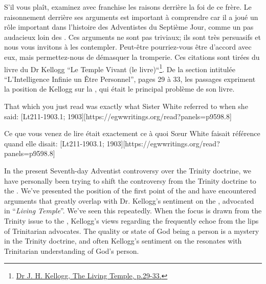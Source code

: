 S'il vous plaît, examinez avec franchise les raisons derrière la foi de ce frère. Le raisonnement derrière ses arguments est important à comprendre car il a joué un rôle important dans l'histoire des Adventistes du Septième Jour, comme un pas audacieux loin des . Ces arguments ne sont pas triviaux; ils sont très persuasifs et nous vous invitons à les contempler. Peut-être pourriez-vous être d'accord avec eux, mais permettez-nous de démasquer la tromperie. Ces citations sont tirées du livre du Dr Kellogg “Le Temple Vivant (le livre)“\footnote{\href{https://archive.org/details/J.H.Kellogg.TheLivingTemple1903}{Dr J. H. Kellogg, The Living Temple, p.29-33.}}. De la section intitulée “L'Intelligence Infinie un Être Personnel”, pages 29 à 33, les passages expriment la position de Kellogg sur la , qui était le principal problème de son livre.


That which you just read was exactly what Sister White referred to when she said: [Lt211-1903.1; 1903][https://egwwritings.org/read?panels=p9598.8]


Ce que vous venez de lire était exactement ce à quoi Sœur White faisait référence quand elle disait: [Lt211-1903.1; 1903][https://egwwritings.org/read?panels=p9598.8]


In the present Seventh-day Adventist controversy over the Trinity doctrine, we have personally been trying to shift the controversy from the Trinity doctrine to the . We’ve presented the position of the first point of the  and have encountered arguments that greatly overlap with Dr. Kellogg’s sentiment on the , advocated in “\textit{Living Temple}”. We’ve seen this repeatedly. When the focus is drawn from the Trinity issue to the , Kellogg’s views regarding the  frequently echoe from the lips of Trinitarian advocates. The quality or state of God being a person is a mystery in the Trinity doctrine, and often Kellogg’s sentiment on the  resonates with Trinitarian understanding of God’s person.


